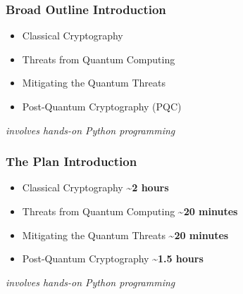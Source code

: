 \documentclass[12pt]{beamer}
\newcommand{\FrameTitle}[2]{\frametitle{#1 \hfill \small\textnormal{\textcolor{midgray}{#2}}}}
\begin{document}
\title{}
\author{}
\date{}
\maketitle

\begin{frame}\FrameTitle{Broad Outline}{Introduction}
    \begin{itemize}
        \item[\ding{52}] Classical Cryptography
        \item[--] Threats from Quantum Computing
        \item[--] Mitigating the Quantum Threats
        \item[\ding{52}] Post-Quantum Cryptography (PQC)
    \end{itemize}
    \vfill\normalsize\textit{ involves hands-on Python programming}
\end{frame}

\begin{frame}\FrameTitle{The Plan}{Introduction}
    \begin{itemize}
        \item[\ding{52}] Classical Cryptography \hfill \textbf{\textasciitilde 2 hours}
        \item[--] Threats from Quantum Computing \hfill \textbf{\textasciitilde 20 minutes}
        \item[--] Mitigating the Quantum Threats \hfill \textbf{\textasciitilde 20 minutes}
        \item[\ding{52}] Post-Quantum Cryptography \hfill \textbf{\textasciitilde 1.5 hours}
    \end{itemize}
    \vfill\normalsize\textit{ involves hands-on Python programming}
\end{frame}
\end{document}
